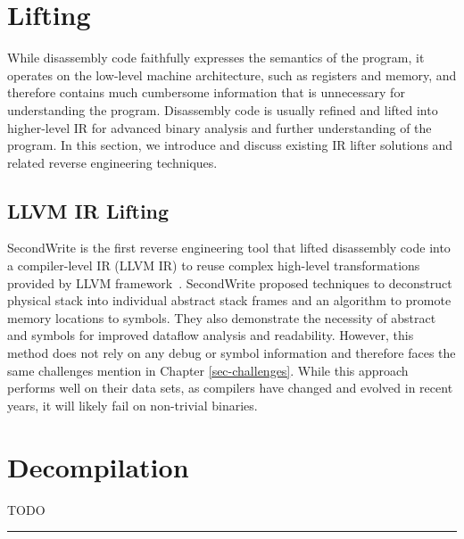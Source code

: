 \section{Lifting} \label{sec:existing-lifting}
While disassembly code faithfully expresses the semantics of the program, it operates on the low-level machine architecture, such as registers and memory, and therefore contains much cumbersome information that is unnecessary for understanding the program. Disassembly code is usually refined and lifted into higher-level IR for advanced binary analysis and further understanding of the program. In this section, we introduce and discuss existing IR lifter solutions and related reverse engineering techniques.

\subsection{LLVM IR Lifting} \label{sec:existing-llvm-lifting}
SecondWrite is the first reverse engineering tool that lifted disassembly code into a compiler-level IR (LLVM IR) to reuse complex high-level transformations provided by LLVM framework~\cite{anand2013compiler}.
SecondWrite proposed techniques to deconstruct physical stack into individual abstract stack frames and an algorithm to promote memory locations to symbols.
They also demonstrate the necessity of abstract and symbols for improved dataflow analysis and readability.
However, this method does not rely on any debug or symbol information and therefore faces the same challenges mention in Chapter \ref{sec-challenges}. While this approach performs well on their data sets, as compilers have changed and evolved in recent years, it will likely fail on non-trivial binaries.

\section{Decompilation} \label{sec:existing-decompilation}
TODO


\noindent\rule{8cm}{0.4pt}

\newpage
